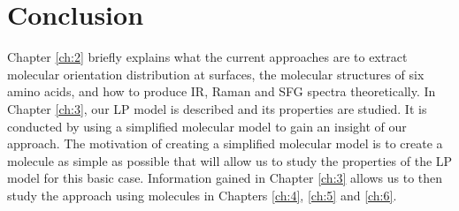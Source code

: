 \section{Conclusion}
Chapter \ref{ch:2} briefly explains what the current approaches are to extract molecular orientation distribution at surfaces, the molecular structures of six amino acids, and how to produce IR, Raman and SFG spectra theoretically. In Chapter \ref{ch:3}, our LP model is described and its properties are studied. It is conducted by using a simplified molecular model to gain an insight of our approach. The motivation of creating a simplified molecular model is to create a molecule as simple as possible that will allow us to study the properties of the LP model for this basic case. Information gained in Chapter \ref{ch:3} allows us to then study the approach using molecules in Chapters \ref{ch:4}, \ref{ch:5} and \ref{ch:6}.